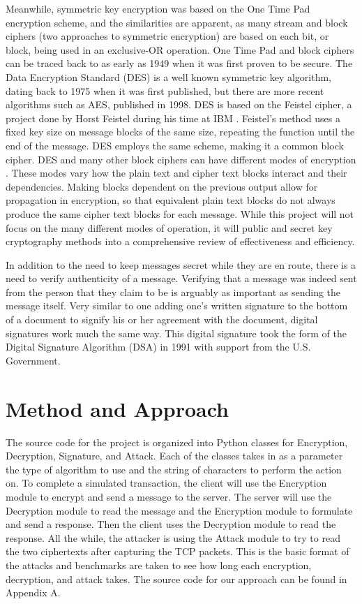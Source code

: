 \documentclass[12pt]{report}
\begin{document}
Meanwhile, symmetric key encryption was based on the One Time Pad encryption scheme, and the similarities are apparent, as many stream and block ciphers (two
approaches to symmetric encryption) are based on each bit, or block, being used in an exclusive-OR operation. One Time Pad and block ciphers can be traced back
to as early as 1949 when it was first proven to be secure. The Data Encryption Standard (DES) is a well known symmetric key algorithm, dating back to 1975 when
it was first published, but there are more recent algorithms such as AES, published in 1998. DES is based on the Feistel cipher, a project done by Horst Feistel
during his time at IBM \cite{feistel}. Feistel's method uses a fixed key size on message blocks of the same size, repeating the function until the end of the
message. DES employs the same scheme, making it a common block cipher. DES and many other block ciphers can have different modes of encryption \cite{modes}. These
modes vary how the plain text and cipher text blocks interact and their dependencies. Making blocks dependent on the previous output allow for propagation in
encryption, so that equivalent plain text blocks do not always produce the same cipher text blocks for each message. While this project will not focus on the many
different modes of operation, it will public and secret key cryptography methods into a comprehensive review of effectiveness and efficiency.

In addition to the need to keep messages secret while they are en route, there is a need to verify authenticity of a message. Verifying that a message was indeed
sent from the person that they claim to be is arguably as important as sending the message itself. Very similar to one adding one's written signature to the bottom
of a document to signify his or her agreement with the document, digital signatures work much the same way. This digital signature took the form of the Digital
Signature Algorithm (DSA) in 1991 with support from the U.S. Government.\cite{mit}\cite{dsa}

\section{Method and Approach}
The source code for the project is organized into Python classes for Encryption, Decryption, Signature, and Attack. Each of the classes takes in as a parameter the
type of algorithm to use and the string of characters to perform the action on. To complete a simulated transaction, the client will use the Encryption module to
encrypt and send a message to the server. The server will use the Decryption module to read the message and the Encryption module to formulate and send a response.
Then the client uses the Decryption module to read the response. All the while, the attacker is using the Attack module to try to read the two ciphertexts after
capturing the TCP packets. This is the basic format of the attacks and benchmarks are taken to see how long each encryption, decryption, and attack takes. The source
code for our approach can be found in Appendix A.
\end{document}
